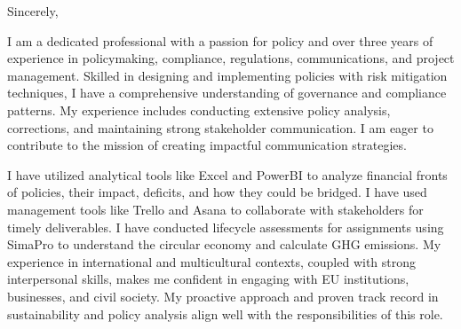\documentclass[11pt,a4paper,roman]{moderncv}
\begin{document}
\begin{minipage}[t]{\textwidth}
\end{minipage}

\opening{\vspace*{-2em}}
\closing{Sincerely,}{\vspace*{-2em}}
\makelettertitle

\justifying

I am a dedicated professional with a passion for policy and over three years of experience in policymaking, compliance, regulations, communications, and project management. Skilled in designing and implementing policies with risk mitigation techniques, I have a comprehensive understanding of governance and compliance patterns. My experience includes conducting extensive policy analysis, corrections, and maintaining strong stakeholder communication. I am eager to contribute to the mission of creating impactful communication strategies. 

I have utilized analytical tools like Excel and PowerBI to analyze financial fronts of policies, their impact, deficits, and how they could be bridged. I have used management tools like Trello and Asana to collaborate with stakeholders for timely deliverables. I have conducted lifecycle assessments for assignments using SimaPro to understand the circular economy and calculate GHG emissions. My experience in international and multicultural contexts, coupled with strong interpersonal skills, makes me confident in engaging with EU institutions, businesses, and civil society. My proactive approach and proven track record in sustainability and policy analysis align well with the responsibilities of this role.

\vspace{0.5cm}

\makeletterclosing
\end{document}
